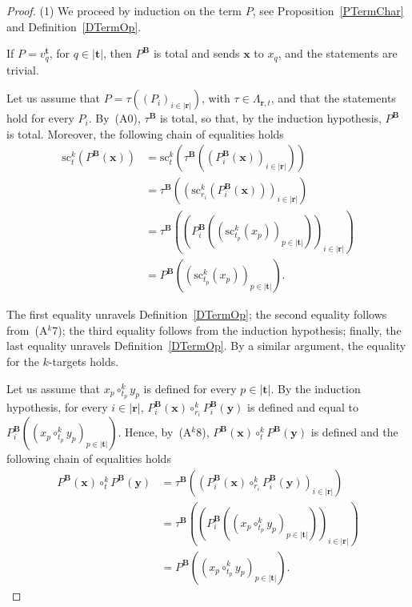 \documentclass[a4paper, reqno
]{amsart}
\newcommand{\bb}[1]{\ensuremath{\lvert #1 \rvert}}
\newcommand{\src}{\mathrm{sc}}
\theoremstyle{plain}
\theoremstyle{definition}
\begin{document}
\begin{proof}
(1) We proceed by induction on the term $P$, see Proposition~\ref{PTermChar} and Definition~\ref{DTermOp}.

If $P=v^{\mathbf{t}}_{q}$, for $q\in\bb{\mathbf{t}}$, then $P^{\mathbf{B}}$ is total and sends $\mathbf{x}$ to $x_{q}$, and the statements are trivial.

Let us assume that $P=\tau((P_{i})_{i\in\bb{\mathbf{r}}})$, with $\tau\in\Lambda_{\mathbf{r},t}$, and that the statements hold for every $P_{i}$.
By~(A0), $\tau^{\mathbf{B}}$ is total, so that, by the induction hypothesis, $P^{\mathbf{B}}$ is total.
Moreover, the following chain of equalities holds
\begin{align*}
\src^{k}_{t}\left(P^{\mathbf{B}}(\mathbf{x})\right)
&=
\src^{k}_{t}\left(\tau^{\mathbf{B}}\left(\left(P_{i}^{\mathbf{B}}(\mathbf{x})\right)_{i\in\bb{\mathbf{r}}}\right)\right)
\tag{1}
\\&=
\tau^{\mathbf{B}}\left(\left(\src^{k}_{r_{i}}\left(P_{i}^{\mathbf{B}}(\mathbf{x})\right)\right)_{i\in\bb{\mathbf{r}}}\right)
\tag{2}
\\&=
\tau^{\mathbf{B}}\left(\left(P_{i}^{\mathbf{B}}\left(\left(\src^{k}_{t_{p}}(x_{p})\right)_{p\in\bb{\mathbf{t}}}\right)\right)_{i\in\bb{\mathbf{r}}}\right)
\tag{3}
\\&=
P^{\mathbf{B}}\left(\left(\src^{k}_{t_{p}}(x_{p})\right)_{p\in\bb{\mathbf{t}}}\right).
\tag{4}
\end{align*}

The first equality unravels Definition~\ref{DTermOp}; the second equality follows from~(A$^{k}$7); the third equality follows from the induction hypothesis; finally, the last equality unravels Definition~\ref{DTermOp}.
By a similar argument, the equality for the $k$-targets holds.

Let us assume that $x_{p}\circ^{k}_{t_{p}}y_{p}$ is defined for every $p\in\bb{\mathbf{t}}$.
By the induction hypothesis, for every $i\in\bb{\mathbf{r}}$, $P_{i}^{\mathbf{B}}(\mathbf{x})\circ^{k}_{r_{i}}P_{i}^{\mathbf{B}}(\mathbf{y})$ is defined and equal to $P_{i}^{\mathbf{B}}((x_{p}\circ^{k}_{t_{p}}y_{p})_{p\in\bb{\mathbf{t}}})$.
Hence, by~(A$^{k}$8), $P^{\mathbf{B}}(\mathbf{x})\circ^{k}_{t}P^{\mathbf{B}}(\mathbf{y})$ is defined and the following chain of equalities holds
\begin{align*}
P^{\mathbf{B}}(\mathbf{x})\circ^{k}_{t}P^{\mathbf{B}}(\mathbf{y})
&=
\tau^{\mathbf{B}}\left(\left(P_{i}^{\mathbf{B}}(\mathbf{x})\circ^{k}_{r_{i}}P_{i}^{\mathbf{B}}(\mathbf{y})\right)_{i\in\bb{\mathbf{r}}}\right)
\tag{1}
\\&=
\tau^{\mathbf{B}}\left(\left(P_{i}^{\mathbf{B}}\left(\left(x_{p}\circ^{k}_{t_{p}}y_{p}\right)_{p\in\bb{\mathbf{t}}}\right)\right)_{i\in\bb{\mathbf{r}}}\right)
\tag{2}
\\&=
P^{\mathbf{B}}\left(\left(x_{p}\circ^{k}_{t_{p}}y_{p}\right)_{p\in\bb{\mathbf{t}}}\right).
\tag{3}
\end{align*}


\end{proof}
\end{document}
